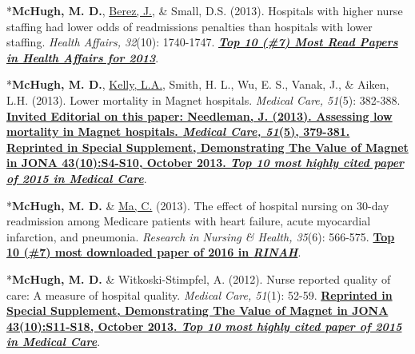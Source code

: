 \documentclass[10pt,]{article}
\begin{document}
{{{{{{{{{{{{{{{\begin{hangparas}{.25in}{1}
\end{hangparas}

\vspace{4mm}

\begin{hangparas}{.25in}{1}

*{\textbf {McHugh, M. D.}}, {\underline {Berez, J.}}, \& Small, D.S. (2013). Hospitals with higher nurse staffing had lower odds of readmissions penalties than hospitals with lower staffing. {\textit {Health Affairs, 32}}(10): 1740-1747. {\textbf {\underline {\textit {Top 10 (\#7) Most Read Papers in Health Affairs for 2013}}}}.

\end{hangparas}

\vspace{4mm}

\begin{hangparas}{.25in}{1}

*{\textbf {McHugh, M. D.}}, {\underline {Kelly, L.A.}}, Smith, H. L., Wu, E. S., Vanak, J., \& Aiken, L.H. (2013). Lower mortality in Magnet hospitals. {\textit {Medical Care, 51}}(5): 382-388. {\textbf {\underline {Invited Editorial on this paper: Needleman, J. (2013). Assessing low mortality in Magnet hospitals. {\textit {Medical Care, 51}}(5), 379-381. Reprinted in Special Supplement, Demonstrating The Value of Magnet in JONA 43(10):S4-S10, October 2013. {\textit {Top 10 most highly cited paper of 2015 in Medical Care}}}}}.

\end{hangparas}

\vspace{4mm}

\begin{hangparas}{.25in}{1}

*{\textbf {McHugh, M. D.}} \& {\underline {Ma, C.}} (2013). The effect of hospital nursing on 30-day readmission among Medicare patients with heart failure, acute myocardial infarction, and pneumonia. {\textit {Research in Nursing \& Health, 35}}(6): 566-575. {\textbf {\underline {Top 10 (\#7) most downloaded paper of 2016 in {\textit {RINAH}}}}}.

\end{hangparas}

\vspace{4mm}

\begin{hangparas}{.25in}{1}

*{\textbf {McHugh, M. D.}} \& Witkoski-Stimpfel, A. (2012). Nurse reported quality of care: A measure of hospital quality. {\textit {Medical Care, 51}}(1): 52-59. {\textbf {\underline {Reprinted in Special Supplement, Demonstrating The Value of Magnet in JONA 43(10):S11-S18, October 2013. {\textit {Top 10 most highly cited paper of 2015 in Medical Care}}}}}.


\end{hangparas}}}}}}}}}}}}}}}}
\end{document}
